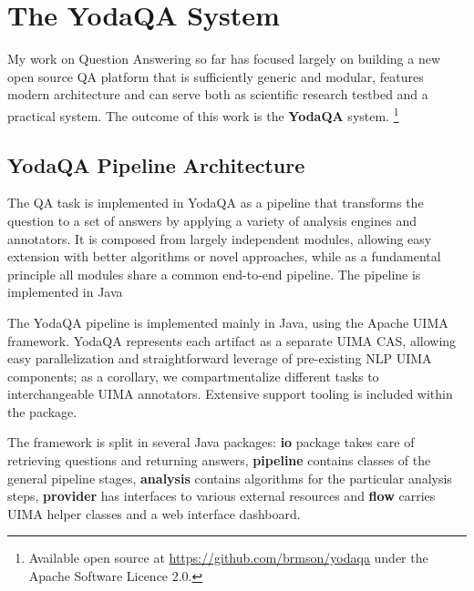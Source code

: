 \chapter{The YodaQA System}
\label{ch:work}

My work on Question Answering so far has focused largely on building
a new open source QA platform that is sufficiently generic and modular,
features modern architecture and can serve both as scientific
research testbed and a practical system.
The outcome of this work is the \textbf{YodaQA} system.%
\footnote{Available open source at \url{https://github.com/brmson/yodaqa}
under the Apache Software Licence 2.0.}

\section{YodaQA Pipeline Architecture}
\label{sec:yodaqaarch}

The QA task is implemented in YodaQA as a pipeline that transforms the
question to a set of answers by applying a variety of analysis engines
and annotators.
It is composed from largely independent modules,
allowing easy extension with better algorithms
or novel approaches, while as a fundamental principle
all modules share a common end-to-end pipeline.
The pipeline is implemented in Java

The YodaQA pipeline is implemented mainly in Java,
using the Apache UIMA framework. \citep{UIMA}
YodaQA represents each artifact
as a separate UIMA CAS, allowing easy
parallelization and straightforward
leverage of pre-existing NLP UIMA components;
as a corollary, we compartmentalize
different tasks to interchangeable UIMA annotators.
Extensive support
tooling is included within the package.

The framework is split in several Java packages: \textbf{io} package takes care
of retrieving questions and returning answers, \textbf{pipeline} contains
classes of the general pipeline stages, \textbf{analysis} contains
algorithms for the particular analysis steps, \textbf{provider} has interfaces
to various external resources and \textbf{flow} carries UIMA helper classes
and a web interface dashboard.

